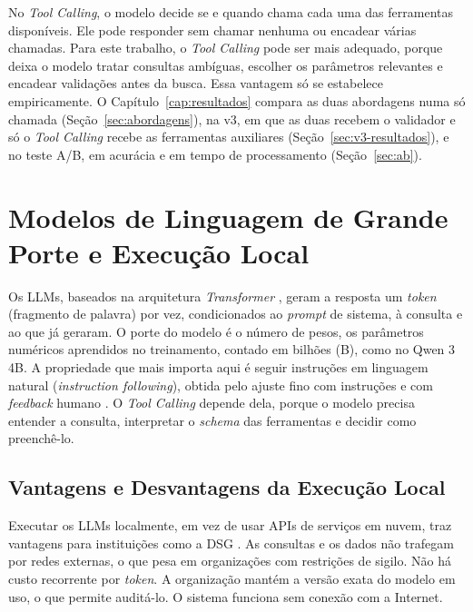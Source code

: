 No \textit{Tool Calling}, o modelo decide se e quando chama cada uma das ferramentas disponíveis. Ele pode responder sem chamar nenhuma ou encadear várias chamadas. Para este trabalho, o \textit{Tool Calling} pode ser mais adequado, porque deixa o modelo tratar consultas ambíguas, escolher os parâmetros relevantes e encadear validações antes da busca. Essa vantagem só se estabelece empiricamente. O Capítulo~\ref{cap:resultados} compara as duas abordagens numa só chamada (Seção~\ref{sec:abordagens}), na v3, em que as duas recebem o validador e só o \textit{Tool Calling} recebe as ferramentas auxiliares (Seção~\ref{sec:v3-resultados}), e no teste A/B, em acurácia e em tempo de processamento (Seção~\ref{sec:ab}).

\section{Modelos de Linguagem de Grande Porte e Execução Local}

Os LLMs, baseados na arquitetura \textit{Transformer} \cite{vaswani2017attention}, geram a resposta um \textit{token} (fragmento de palavra) por vez, condicionados ao \textit{prompt} de sistema, à consulta e ao que já geraram. O porte do modelo é o número de pesos, os parâmetros numéricos aprendidos no treinamento, contado em bilhões (B), como no Qwen 3 4B. A propriedade que mais importa aqui é seguir instruções em linguagem natural (\textit{instruction following}), obtida pelo ajuste fino com instruções e com \textit{feedback} humano \cite{ouyang2022training}. O \textit{Tool Calling} depende dela, porque o modelo precisa entender a consulta, interpretar o \textit{schema} das ferramentas e decidir como preenchê-lo.

\subsection{Vantagens e Desvantagens da Execução Local}

Executar os LLMs localmente, em vez de usar APIs de serviços em nuvem, traz vantagens para instituições como a DSG \cite{ollama2023}. As consultas e os dados não trafegam por redes externas, o que pesa em organizações com restrições de sigilo. Não há custo recorrente por \textit{token}. A organização mantém a versão exata do modelo em uso, o que permite auditá-lo. O sistema funciona sem conexão com a Internet.

